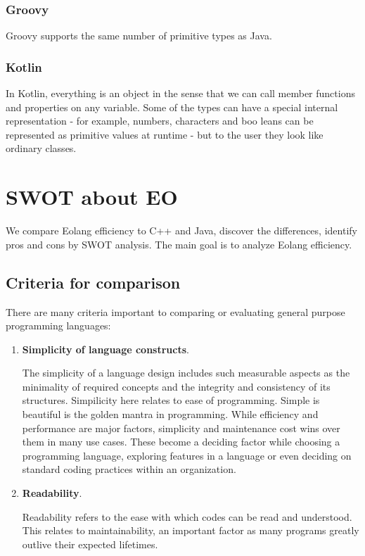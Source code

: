\documentclass[12pt]{book}
\begin{document}
{{\subsection{Groovy}
Groovy supports the same number of primitive types as Java.

\subsection{Kotlin}
In Kotlin, everything is an object in the sense that we can call member functions and properties on any variable.  Some of the types can have a special internal representation - for example,  numbers, characters and boo leans can be represented  as primitive values at runtime - but to the user they look like ordinary classes.

\chapter{SWOT about EO}
We compare Eolang efficiency to C++ and Java, discover the differences, identify pros and cons by SWOT analysis. The main goal is to analyze Eolang efficiency.

\section{Criteria for comparison}
There are many criteria important to comparing or evaluating general purpose programming languages:

\begin{enumerate}
    \item \textbf{Simplicity of language constructs}.

The simplicity of a language design includes such measurable aspects as the minimality of required concepts and the integrity and consistency of its structures. Simpilicity here relates to ease of programming. Simple is beautiful is the golden mantra in programming. While efficiency and performance are major factors, simplicity and maintenance cost wins over them in many use cases. These become a deciding factor while choosing a programming language, exploring features in a language or even deciding on standard coding practices within an organization.

    \item \textbf{Readability}.

Readability refers to the ease with which codes can be read and understood. This relates to maintainability, an important factor as many programs greatly outlive their expected lifetimes.


\end{enumerate}}}
\end{document}
